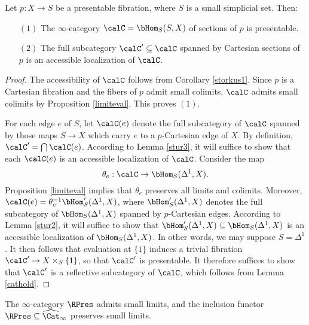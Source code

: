 \begin{proposition}\label{seccatdog}
Let $p: X \rightarrow S$ be a presentable fibration, where $S$ is a small simplicial set. 
Then: 
\begin{itemize}
\item[$(1)$] The $\infty$-category $\calC = \bHom_{S}(S,X)$ of sections of $p$ is presentable.
\item[$(2)$] The full subcategory $\calC' \subseteq \calC$ spanned by Cartesian sections of $p$ is an accessible localization of $\calC$.
\end{itemize}
\end{proposition}

\begin{proof}
The accessibility of $\calC$ follows from Corollary \ref{storkus1}. Since $p$ is a Cartesian fibration and the fibers of $p$ admit small colimits, $\calC$ admits small colimits by Proposition \ref{limiteval}. This proves $(1)$.

For each edge $e$ of $S$, let $\calC(e)$ denote the full subcategory of $\calC$ spanned by those maps $S \rightarrow X$ which carry $e$ to a $p$-Cartesian edge of $X$. By definition,
$\calC' = \bigcap \calC(e)$. According to Lemma \ref{stur3}, it will suffice to show that each
$\calC(e)$ is an accessible localization of $\calC$. Consider the map
$$ \theta_e: \calC \rightarrow \bHom_{S}( \Delta^1, X).$$
Proposition \ref{limiteval} implies that $\theta_{e}$ preserves all limits and colimits. 
Moreover, $\calC(e) = \theta_{e}^{-1} \bHom_{S}'(\Delta^1,X)$, where
$\bHom_{S}'(\Delta^1,X)$ denotes the full subcategory of $\bHom_{S}(\Delta^1,X)$ spanned by $p$-Cartesian edges. According to Lemma \ref{stur2}, it will suffice to show that
$\bHom_{S}'(\Delta^1,X) \subseteq \bHom_{S}(\Delta^1,X)$ is an accessible localization
of $\bHom_{S}(\Delta^1,X)$.
In other words, we may suppose $S = \Delta^1$. It then follows that evaluation at 
$\{1\}$ induces a trivial fibration $\calC' \rightarrow X \times_{S} \{1\}$, so that
$\calC'$ is presentable. It therefore suffices to show that $\calC'$ is a reflective subcategory of $\calC$, which follows from Lemma \ref{cathold}.
\end{proof}

\begin{theorem}\label{surbus}
The $\infty$-category $\RPres$ admits small limits, and the inclusion functor
$\RPres \subseteq \widehat{\Cat}_{\infty}$ preserves small limits.
\end{theorem}


